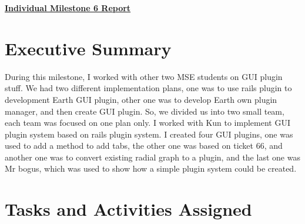 \documentclass{article}
\begin{document}
\pagestyle{headings}

\begin{center}
{\LARGE\textbf{\underline{{Individual Milestone 6 Report}}}}
\end{center}

\section*{Executive Summary}

During this milestone, I worked with other two MSE students on GUI plugin stuff. We had two different implementation plans, one was to use rails plugin to development Earth GUI plugin, other one was to develop Earth own plugin manager, and then create GUI plugin. So, we divided us into two small team, each team was focused on one plan only. I worked with Kun to implement GUI plugin system based on rails plugin system. I created four GUI plugins, one was used to add a method to add tabs, the other one was based on ticket 66, and another one was to convert existing radial graph to a plugin, and the last one was Mr bogus, which was used to show how a simple plugin system could be created.

\section*{Tasks and Activities Assigned}
\end{document}
